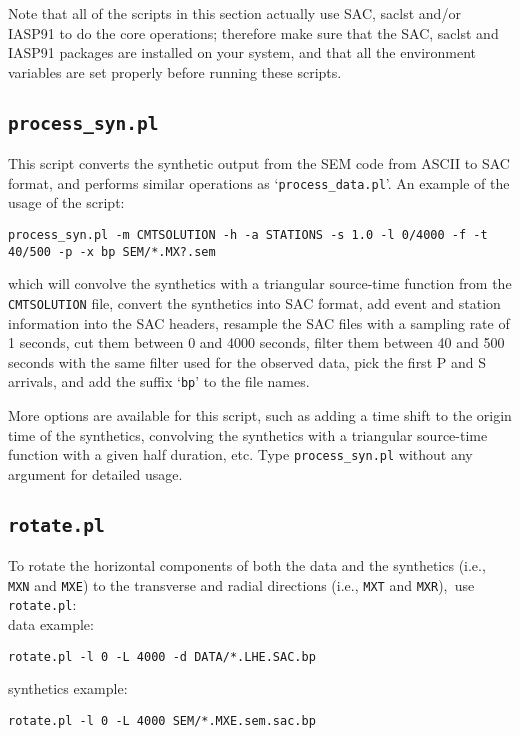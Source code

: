Note that all of the scripts in this section actually use SAC,
saclst and/or IASP91 to do the core operations; therefore make sure
that the SAC, saclst and IASP91 packages are installed on your
system, and that all the environment variables are set properly before
running these scripts.


\subsection{\texttt{process\_syn.pl}}\label{sub:process_syn.pl}

This script converts the synthetic output from the SEM code from ASCII
to SAC format, and performs similar operations as `\texttt{process\_data.pl}'.
An example of the usage of the script:

{\footnotesize
\begin{verbatim}
process_syn.pl -m CMTSOLUTION -h -a STATIONS -s 1.0 -l 0/4000 -f -t 40/500 -p -x bp SEM/*.MX?.sem
\end{verbatim}
}

\noindent
which will convolve the synthetics with a triangular source-time function
from the \texttt{CMTSOLUTION} file, convert the synthetics into SAC
format, add event and station information into the SAC headers, resample the SAC files with a sampling rate of 1 seconds, cut them between 0 and 4000 seconds, filter them between 40 and
500 seconds with the same filter used for the observed data, pick the first P and S arrivals, and add the suffix `\texttt{bp}'
to the file names.\newline


More options are available for this script, such as adding a time shift
to the origin time of the synthetics, convolving the synthetics with
a triangular source-time function with a given half duration, etc.
Type \texttt{process\_syn.pl} without any argument for detailed
usage.


\subsection{\texttt{rotate.pl}}

To rotate the horizontal components of both the data and the synthetics
(i.e., \texttt{MXN} and \texttt{MXE}) to the transverse and radial directions (i.e., \texttt{MXT} and \texttt{MXR}),\texttt{\small{}
}use{\small{} }\texttt{\small rotate.pl}:\\

\noindent
data example:
\begin{verbatim}
rotate.pl -l 0 -L 4000 -d DATA/*.LHE.SAC.bp
\end{verbatim}
synthetics example:
\begin{verbatim}
rotate.pl -l 0 -L 4000 SEM/*.MXE.sem.sac.bp
\end{verbatim}

